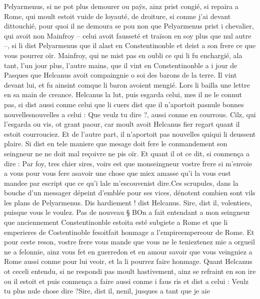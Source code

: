 \documentclass{article}
\begin{document}
\begin{pages}
   Pelyarmenus, si ne pot plus demourer ou paÿs, 
   ainz prist congié, si repaira a Rome, qui moult estoit vuide de loyauté, de droiture, 
   si conme j’ai devant dittouchié, 
   pour quoi il ne demoura se pou non que Pelyarmenus 
   prist i chevalier, qui avoit non Mainfroy 
   – celui avoit fausseté et traïson en soy plus que nul autre –, si li dist Pelyarmenus que 
   il alast en Constentinonble 
   et deist a son frere ce que vous pourrez oïr. 
   Mainfroy, qui ne mist pas en oubli ce qui li fu enchargié, ala tant, l’un jour
   plus, 
   l’autre mains, que il vint en Constentinonble a i jour de Pasques 
   que Helcanus avoit compaingnie o soi des barons de la terre. Il vint devant lui, 
   et fu ainsint comque li baron avoient mengié. Lors li bailla une lettre 
   en sa main de creance. 
   Helcanus la lut, puis esgarda celui, mes il ne le connut pas, si dist aussi conme celui 
   que li cuers dist que il n’aportoit pasnule bonnes 
   nouvellesnouvelles a celui :
   Que veulz tu dire ?, aussi conme en courrous. 
   Cilz, qui l’esgarda ou vis, ot grant paour, car moult avoit Helcanus fier regart quant il estoit 
   courrouciez. Et de l’autre part, il n’aportoit pas nouvelles quiqui li 
   deussent plaire. Si dist en tele maniere que mesage doit fere le conmandement son seingneur 
      ne ne doit mal reçoivre ne pis oïr. Et quant il ot ce dit, si conmença a dire :
   Par foy, tres chier sires, voirs est que monseingneur vostre frere 
      si m’envoie a vous pour vous fere asavoir une chose que miex amasse qu’i la vous eust mandee par 
      escript que ce qu’i lale 
      m'escouvenist dire.Ces scrupules, dans la bouche d'un messager dépeint d'emblée pour ses vices, 
      dénotent combien sont vils les plans de Pelyarmenus.
   Dis hardiement ! dist Helcanus.
   Sire, dist il, volentiers, 
      puisque vous le voulez. \pend 
\pstart Pas de nouveau § BOn a fait entendant a 
   mon seingneur 
   que anciennement Constentinonble 
   estoita esté subgiete a Rome 
   et que li emperieres de Costentinoble 
   fesoitfait honmage a 
   l’empireempereour de 
   Rome. Et pour ceste reson, vostre frere vous mande que 
   vous ne le tenieztenez mie a orgueil ne a 
      felonnie, ainz vous fet en guerredon et en amour savoir que vous 
      veingniez a Rome aussi conme pour lui veoir, et la li pourrez faire honmage. \pend
\pstart Quant Helcanus ot 
   ceceli entendu, si ne respondi pas moult hastivement, 
   ainz se refraint en son ire ou il estoit et puis conmença a faire aussi conme 
   i faus ris et dist a celui :
   Veulz tu plus nule chose dire ?Sire, dist il, nenil, jusques a tant que je aie 

\end{pages}
\end{document}
